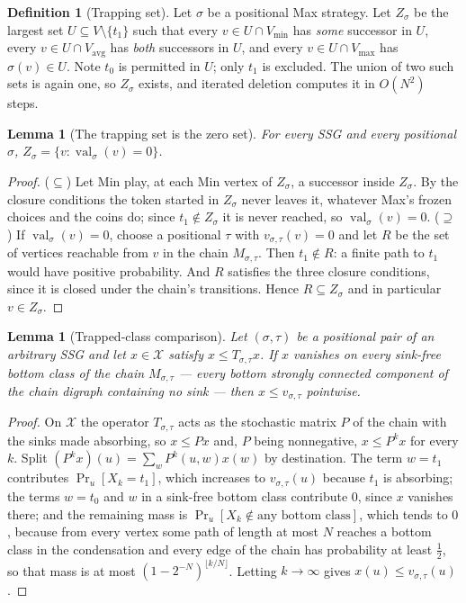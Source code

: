 \documentclass[11pt]{article}
\theoremstyle{plain}
\newtheorem{lemma}[theorem]{Lemma}
\theoremstyle{definition}
\newtheorem{definition}[theorem]{Definition}
\DeclareMathOperator{\val}{val}
\newcommand{\Vmax}{V_{\max}}
\newcommand{\Vmin}{V_{\min}}
\newcommand{\Vavg}{V_{\mathrm{avg}}}
\begin{document}
\begin{definition}[Trapping set]\label{def:trap}
Let $\sigma$ be a positional Max strategy. Let $Z_\sigma$ be the largest
set $U\subseteq V\setminus\{t_1\}$ such that every $v\in U\cap\Vmin$ has
\emph{some} successor in $U$, every $v\in U\cap\Vavg$ has \emph{both}
successors in $U$, and every $v\in U\cap\Vmax$ has $\sigma(v)\in U$. Note
$t_0$ is permitted in $U$; only $t_1$ is excluded. The union of two such
sets is again one, so $Z_\sigma$ exists, and iterated deletion computes it
in $O(N^{2})$ steps.
\end{definition}

\begin{lemma}[The trapping set is the zero set]\label{lem:trap}
For every SSG and every positional $\sigma$,
$Z_\sigma=\{v:\val_\sigma(v)=0\}$.
\end{lemma}

\begin{proof}
($\subseteq$) Let Min play, at each Min vertex of $Z_\sigma$, a successor
inside $Z_\sigma$. By the closure conditions the token started in
$Z_\sigma$ never leaves it, whatever Max's frozen choices and the coins
do; since $t_1\notin Z_\sigma$ it is never reached, so
$\val_\sigma(v)=0$.
($\supseteq$) If $\val_\sigma(v)=0$, choose a positional $\tau$ with
$v_{\sigma,\tau}(v)=0$ and let $R$ be the set of vertices reachable from
$v$ in the chain $M_{\sigma,\tau}$. Then $t_1\notin R$: a finite path to
$t_1$ would have positive probability. And $R$ satisfies the three
closure conditions, since it is closed under the chain's transitions.
Hence $R\subseteq Z_\sigma$ and in particular $v\in Z_\sigma$.
\end{proof}

\begin{lemma}[Trapped-class comparison]\label{lem:trapped-comparison}
Let $(\sigma,\tau)$ be a positional pair of an arbitrary SSG and let
$x\in\mathcal{X}$ satisfy $x\le T_{\sigma,\tau}x$. If $x$ vanishes on
every sink-free bottom class of the chain $M_{\sigma,\tau}$ --- every
bottom strongly connected component of the chain digraph containing no
sink --- then $x\le v_{\sigma,\tau}$ pointwise.
\end{lemma}

\begin{proof}
On $\mathcal{X}$ the operator $T_{\sigma,\tau}$ acts as the stochastic
matrix $P$ of the chain with the sinks made absorbing, so $x\le Px$ and, $P$
being nonnegative, $x\le P^{k}x$ for every $k$. Split
$(P^{k}x)(u)=\sum_w P^{k}(u,w)x(w)$ by destination. The term $w=t_1$
contributes $\Pr_u[X_k=t_1]$, which increases to $v_{\sigma,\tau}(u)$
because $t_1$ is absorbing; the terms $w=t_0$ and $w$ in a sink-free
bottom class contribute $0$, since $x$ vanishes there; and the remaining
mass is $\Pr_u[X_k\notin\text{any bottom class}]$, which tends to $0$,
because from every vertex some path of length at most $N$ reaches a
bottom class in the condensation and every edge of the chain has
probability at least $\tfrac12$, so that mass is at most
$(1-2^{-N})^{\lfloor k/N\rfloor}$. Letting $k\to\infty$ gives
$x(u)\le v_{\sigma,\tau}(u)$.
\end{proof}
\end{document}
